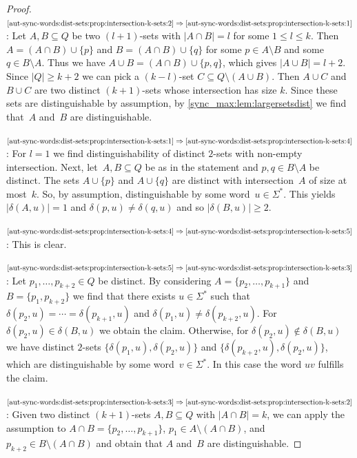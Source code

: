 \begin{proof}
$\ref{aut-sync-words:dist-sets:prop:intersection-k-sets:2} \Rightarrow \ref{aut-sync-words:dist-sets:prop:intersection-k-sets:1}$: 
 Let $A,B \subseteq Q$ 
 be two $(l+1)$-sets with $|A \cap B| = l$
 for some $1 \le l \le k$.
 Then $A = (A \cap B) \cup \{p\}$ 
 and $B = (A \cap B) \cup \{q\}$
 for some $p \in A \setminus B$
 and some $q \in B \setminus A$.
 Thus we have $A \cup B = (A \cap B) \cup \{p,q\}$,
 which gives $|A\cup B| = l + 2$.
 Since $|Q| \ge k + 2$
 we can pick a $(k - l)$-set $C \subseteq Q \setminus ( A \cup B )$.
 Then $A \cup C$ and $B \cup C$ are two distinct $(k+1)$-sets
 whose intersection has size $k$.
 Since these sets are distinguishable by assumption, 
 by \cref{sync_max:lem:largersetsdist} we find that~$A$ and~$B$ are distinguishable.

$\ref{aut-sync-words:dist-sets:prop:intersection-k-sets:1} \Rightarrow \ref{aut-sync-words:dist-sets:prop:intersection-k-sets:4}$: For $l = 1$
 we find distinguishability of
 distinct $2$-sets with non-empty intersection.
 Next, let~$A,B \subseteq Q$ be as in the statement and $p,q \in B \setminus A$ be distinct.
 The sets $A \cup \{p\}$
 and $A \cup \{q\}$ are distinct with intersection~$A$
 of size at most~$k$.
 So, by assumption, distinguishable by some word~$u \in \Sigma^*$.
 This yields $|\delta(A, u)| = 1$
 and $\delta(p, u) \ne \delta(q, u)$
 and so $|\delta(B, u)| \ge 2$.

$\ref{aut-sync-words:dist-sets:prop:intersection-k-sets:4} \Rightarrow \ref{aut-sync-words:dist-sets:prop:intersection-k-sets:5}$: This is clear.

$\ref{aut-sync-words:dist-sets:prop:intersection-k-sets:5} \Rightarrow \ref{aut-sync-words:dist-sets:prop:intersection-k-sets:3}$: Let $p_1, \ldots, p_{k+2} \in Q$ be distinct.
 By considering $A = \{p_2, \ldots, p_{k+1}\}$ and $B = \{p_1, p_{k+2}\}$
 we find that there exists $u \in \Sigma^*$
 such that $\delta(p_2, u) = \cdots = \delta(p_{k+1}, u)$
 and $\delta(p_1, u) \ne \delta(p_{k+2}, u)$.
 For $\delta(p_2, u) \in \delta(B, u)$
 we obtain the claim.
 Otherwise, for $\delta(p_2, u) \notin \delta(B, u)$
 we have distinct $2$-sets $\{\delta(p_1, u), \delta(p_2, u)\}$
 and $\{\delta(p_{k+2}, u), \delta(p_2, u)\}$, which
 are distinguishable by some word~$v \in \Sigma^*$.
 In this case the word $uv$ fulfills the claim.	
 
$\ref{aut-sync-words:dist-sets:prop:intersection-k-sets:3} \Rightarrow \ref{aut-sync-words:dist-sets:prop:intersection-k-sets:2}$: Given two distinct $(k+1)$-sets $A,B \subseteq Q$
with $|A \cap B| = k$,
we can apply the assumption to $A \cap B = \{p_2, \ldots, p_{k+1}\}$, $p_1 \in A \setminus (A \cap B)$,
and $p_{k+2} \in B \setminus (A \cap B)$
and obtain that $A$ and~$B$ are distinguishable.
\end{proof}

